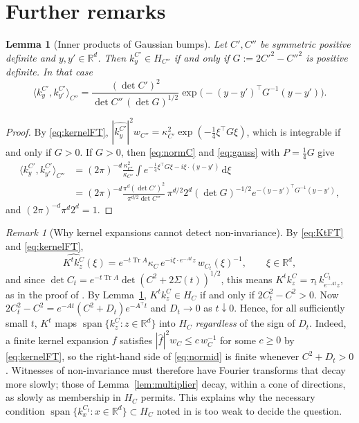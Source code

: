 \documentclass[11pt]{amsart}
\numberwithin{equation}{section}
\newtheorem{lemma}[theorem]{Lemma}
\theoremstyle{definition}
\theoremstyle{remark}
\newtheorem{remark}[theorem]{Remark}
\newcommand{\R}{\mathbb{R}}
\newcommand{\Tr}{\operatorname{Tr}}
\newcommand{\dd}{\,\mathrm{d}}
\newcommand{\ip}[2]{\langle #1,#2\rangle}
\newcommand{\hatf}[1]{\widehat{#1}}
\newcommand{\tp}{\top}
\begin{document}
\section{Further remarks}\label{sec:remarks}

\begin{lemma}[Inner products of Gaussian bumps]\label{lem:bumps}
Let $C',C''$ be symmetric positive definite and $y,y'\in\R^d$. Then $k^{C'}_y\in H_{C''}$ if and only if
$G:=2C'^2-C''^2$ is positive definite. In that case
\[
\ip{k^{C'}_y}{k^{C'}_{y'}}_{C''}=\frac{(\det C')^2}{\det C''\,(\det G)^{1/2}}\exp\bigl(-(y-y')^\tp G^{-1}(y-y')\bigr).
\]
\end{lemma}

\begin{proof}
By \eqref{eq:kernelFT}, $|\hatf{k^{C'}_y}|^2w_{C''}=\kappa_{C'}^2\exp(-\frac14\xi^\tp G\xi)$, which is integrable if and
only if $G>0$. If $G>0$, then \eqref{eq:normC} and \eqref{eq:gauss} with $P=\frac14G$ give
\begin{align*}
\ip{k^{C'}_y}{k^{C'}_{y'}}_{C''}
&=(2\pi)^{-d}\frac{\kappa_{C'}^2}{\kappa_{C''}}\int e^{-\frac14\xi^\tp G\xi-i\xi\cdot(y-y')}\dd\xi\\
&=(2\pi)^{-d}\frac{\pi^d(\det C')^2}{\pi^{d/2}\det C''}\,\pi^{d/2}2^d(\det G)^{-1/2}e^{-(y-y')^\tp G^{-1}(y-y')},
\end{align*}
and $(2\pi)^{-d}\pi^d2^d=1$.
\end{proof}

\begin{remark}[Why kernel expansions cannot detect non-invariance]\label{rem:sections}
By \eqref{eq:KtFT} and \eqref{eq:kernelFT},
\[
\hatf{K^tk^C_z}(\xi)=e^{-t\Tr A}\kappa_C\,e^{-i\xi\cdot e^{-At}z}\,w_{C_t}(\xi)^{-1},\qquad\xi\in\R^d ,
\]
and since $\det C_t=e^{-t\Tr A}\det(C^2+2\Sigma(t))^{1/2}$, this means $K^tk^C_z=\tau_t\,k^{C_t}_{e^{-At}z}$, as in the
proof of \cite[Proposition~4.1]{PSWPN}. By Lemma~\ref{lem:bumps}, $K^tk^C_z\in H_C$ if and only if $2C_t^2-C^2>0$. Now
$2C_t^2-C^2=e^{-At}(C^2+D_t)e^{-A^\tp t}$ and $D_t\to0$ as $t\downarrow0$. Hence, for all sufficiently small $t$, $K^t$
maps $\operatorname{span}\{k^C_z:z\in\R^d\}$ into $H_C$ \emph{regardless} of the sign of $D_t$. Indeed, a finite kernel
expansion $f$ satisfies $|\hatf f|^2w_C\le c\,w_C^{-1}$ for some $c\ge0$ by \eqref{eq:kernelFT}, so the right-hand side
of \eqref{eq:normid} is finite whenever $C^2+D_t>0$. Witnesses of non-invariance must therefore have Fourier
transforms that decay more slowly; those of Lemma~\ref{lem:multiplier} decay, within a cone of directions, as slowly as
membership in $H_C$ permits. This explains why the necessary condition
$\operatorname{span}\{k^{C_t}_x:x\in\R^d\}\subset H_C$ noted in \cite[Remark~4.2]{PSWPN} is too weak to decide the
question.
\end{remark}
\end{document}
